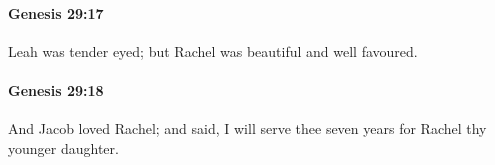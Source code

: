 		\paragraph{Genesis 29:17} %
			\label{GENESIS-29-17}

			Leah was tender eyed; but Rachel was beautiful and well favoured.


		\paragraph{Genesis 29:18} %
			\label{GENESIS-29-18}

			And Jacob loved Rachel; and said, I will serve thee seven years for Rachel thy younger daughter.


